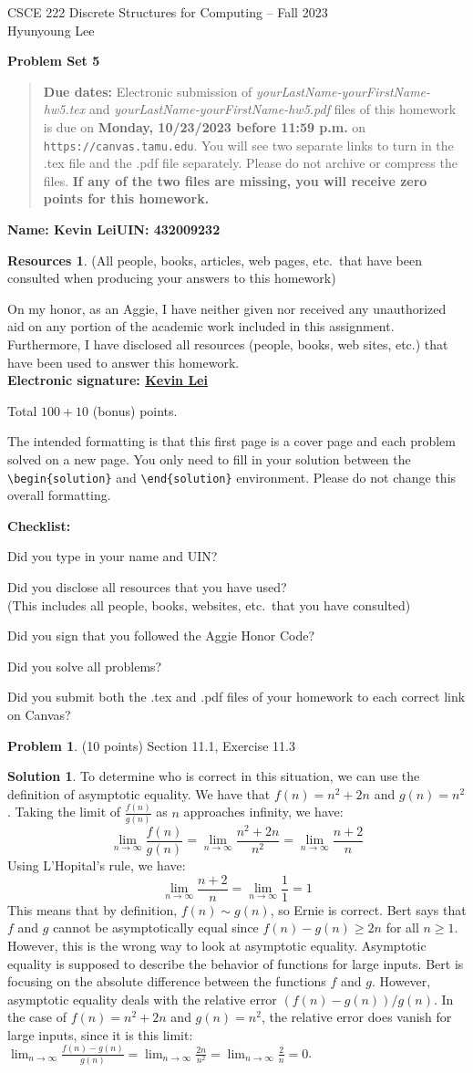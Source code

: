 \documentclass{article}
\theoremstyle{definition}
\newtheorem{problem}{Problem}
\newtheorem*{solution}{Solution}
\newtheorem*{resources}{Resources}
\newcommand{\name}[2]{\noindent\textbf{Name: #1}\hfill \textbf{UIN: #2}
  \newcommand{\myName}{#1}
  \newcommand{\myUIN}{#2}
}
\newcommand{\honor}{\noindent On my honor, as an Aggie, I have neither
  given nor received any unauthorized aid on any portion of the
  academic work included in this assignment. Furthermore, I have
  disclosed all resources (people, books, web sites, etc.) that have
  been used to answer this homework. \\[2ex]
 \textbf{Electronic signature: \underline{Kevin Lei} } } %
\newcommand{\checklist}{\noindent\textbf{Checklist:}
\begin{compactitem}[$\Box$] 
\item Did you type in your name and UIN? 
\item Did you disclose all resources that you have used? \\
(This includes all people, books, websites, etc.\ that you have consulted)
\item Did you sign that you followed the Aggie Honor Code? 
\item Did you solve all problems? 
\item Did you submit both the .tex and .pdf files of your homework to each correct link on Canvas? 
\end{compactitem}
}
\newcommand{\problemset}[1]{\begin{center}\textbf{Problem Set #1}\end{center}}
\newcommand{\duedate}[1]{\begin{quote}\textbf{Due dates:} Electronic
    submission of \textsl{yourLastName-yourFirstName-hw5.tex} and 
    \textsl{yourLastName-yourFirstName-hw5.pdf} files of this homework is due on
    \textbf{#1} on \texttt{https://canvas.tamu.edu}. You will see two separate links
    to turn in the .tex file and the .pdf file separately. Please do not archive or compress the files.  
    \textbf{If any of the two files are missing, you will receive zero points for this homework.}\end{quote} }
\begin{document}
\begin{center}
{\large
CSCE 222 Discrete Structures for Computing -- Fall 2023\\[.5ex]
Hyunyoung Lee\\}
\end{center}
\problemset{5}
\duedate{Monday, 10/23/2023 before 11:59 p.m.}
\name{Kevin Lei}{432009232} %

\begin{resources} (All people, books, articles, web pages, etc.\ that
  have been consulted when producing your answers to this homework)
\end{resources}
\honor

\bigskip

\noindent
Total $100+10$ (bonus) points.

\bigskip

\noindent
The intended formatting is that this first page is a cover page and each 
problem solved on a new page. You only need to fill in your solution between 
the \verb|\begin{solution}| and \verb|\end{solution}| environment.  
Please do not change this overall formatting.

\bigskip

\vfill
\checklist

\newpage
\begin{problem} (10 points) Section 11.1, Exercise 11.3 
\end{problem}
\begin{solution}
To determine who is correct in this situation, we can use the definition of asymptotic equality. 
We have that $f(n) = n^2 + 2n$ and $g(n) = n^2$.
Taking the limit of $\frac{f(n)}{g(n)}$ as $n$ approaches infinity, we have:
$$ \lim_{n \to \infty} \frac{f(n)}{g(n)} = \lim_{n \to \infty} \frac{n^2 + 2n}{n^2} = \lim_{n \to \infty} \frac{n + 2}{n} $$
Using L'Hopital's rule, we have:
$$ \lim_{n \to \infty} \frac{n + 2}{n} = \lim_{n \to \infty} \frac{1}{1} = 1 $$
This means that by definition, $f(n) \sim g(n)$, so Ernie is correct.
Bert says that $f$ and $g$ cannot be asymptotically equal since $f(n) - g(n) \geq 2n$ for all $n \geq 1$.
However, this is the wrong way to look at asymptotic equality.
Asymptotic equality is supposed to describe the behavior of functions for large inputs.
Bert is focusing on the absolute difference between the functions $f$ and $g$.
However, asymptotic equality deals with the relative error $(f(n) - g(n)) / g(n)$.
In the case of $f(n) = n^2 + 2n$ and $g(n) = n^2$, the relative error does vanish for large inputs,
since it is this limit: $\lim_{n \to \infty} \frac{f(n) - g(n)}{g(n)} = \lim_{n \to \infty} \frac{2n}{n^2} = \lim_{n \to \infty} \frac{2}{n} = 0$.
\end{solution}
\end{document}
